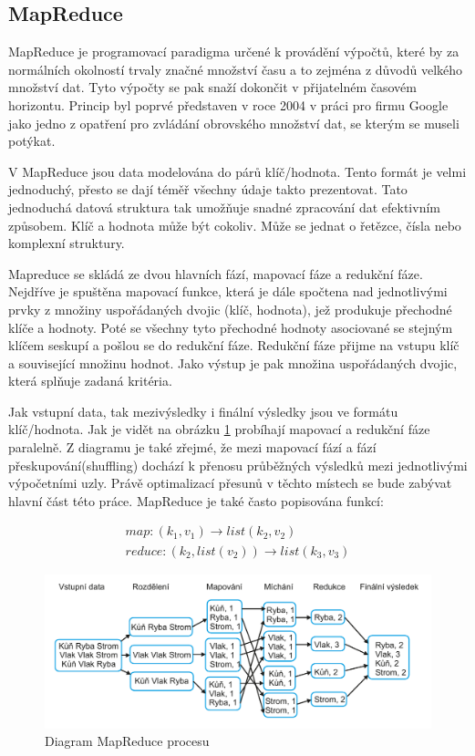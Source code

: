 \documentclass[thesis=M,czech]{FITthesis}[2012/06/26]
\begin{document}
\subsection{MapReduce}
MapReduce je programovací paradigma určené k provádění výpočtů, které by za normálních okolností trvaly značné množství času a to zejména z důvodů velkého množství dat. Tyto výpočty se pak snaží dokončit v přijatelném časovém horizontu. Princip byl poprvé představen v roce 2004 v  práci pro firmu Google jako jedno z opatření pro zvládání obrovského množství dat, se kterým se museli potýkat.

V MapReduce jsou data modelována do párů klíč/hodnota. Tento formát je velmi jednoduchý, přesto se dají téměř všechny údaje takto prezentovat. Tato jednoduchá datová struktura tak umožňuje snadné zpracování dat efektivním způsobem. Klíč a hodnota může být cokoliv. Může se jednat o řetězce, čísla nebo komplexní struktury.

Mapreduce se skládá ze dvou hlavních fází, mapovací fáze a redukční fáze. Nejdříve je spuštěna mapovací funkce, která je dále spočtena nad jednotlivými prvky z množiny uspořádaných dvojic (klíč, hodnota), jež produkuje přechodné klíče a hodnoty.\cite{HadoopDG}
Poté se všechny tyto přechodné hodnoty asociované se stejným klíčem seskupí a pošlou se do redukční fáze. Redukční fáze přijme na vstupu klíč a související množinu hodnot. Jako výstup je pak množina uspořádaných dvojic, která splňuje zadaná kritéria.

Jak vstupní data, tak mezivýsledky i finální výsledky jsou ve formátu klíč/hodnota. Jak je vidět na obrázku \ref{fig:mapred} probíhají mapovací a redukční fáze paralelně. Z diagramu je také zřejmé, že mezi mapovací fází a fází přeskupování(shuffling) dochází k přenosu průběžných výsledků mezi jednotlivými výpočetními uzly. Právě optimalizací přesunů v těchto místech se bude zabývat hlavní část této práce. 
MapReduce je také často popisována funkcí: 

\begin{eqnarray}
	map: (k_1, v_1) \rightarrow  list(k_2, v_2) \nonumber \\
	reduce: (k_2, list(v_2)) \rightarrow list(k_3, v_3) \nonumber 
\end{eqnarray}

\begin{figure}\centering
	\includegraphics[width=1\textwidth, angle=0]			{files/MapReduce}
	\caption[Diagram MapReduce procesu]{Diagram MapReduce procesu}\label{fig:mapred}
\end{figure} 
\end{document}
